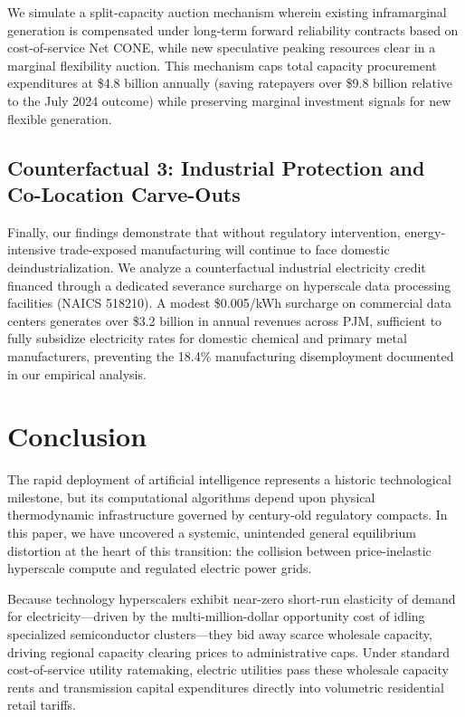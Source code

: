 \documentclass[11pt,a4paper]{article}
\begin{document}
We simulate a split-capacity auction mechanism wherein existing inframarginal generation is compensated under long-term forward reliability contracts based on cost-of-service Net CONE, while new speculative peaking resources clear in a marginal flexibility auction. This mechanism caps total capacity procurement expenditures at \$4.8 billion annually (saving ratepayers over \$9.8 billion relative to the July 2024 outcome) while preserving marginal investment signals for new flexible generation.

\subsection{Counterfactual 3: Industrial Protection and Co-Location Carve-Outs}

Finally, our findings demonstrate that without regulatory intervention, energy-intensive trade-exposed manufacturing will continue to face domestic deindustrialization. We analyze a counterfactual industrial electricity credit financed through a dedicated severance surcharge on hyperscale data processing facilities (NAICS 518210). A modest \$0.005/kWh surcharge on commercial data centers generates over \$3.2 billion in annual revenues across PJM, sufficient to fully subsidize electricity rates for domestic chemical and primary metal manufacturers, preventing the 18.4\% manufacturing disemployment documented in our empirical analysis.

\newpage

\section{Conclusion}\label{sec:conclusion}

The rapid deployment of artificial intelligence represents a historic technological milestone, but its computational algorithms depend upon physical thermodynamic infrastructure governed by century-old regulatory compacts. In this paper, we have uncovered a systemic, unintended general equilibrium distortion at the heart of this transition: the collision between price-inelastic hyperscale compute and regulated electric power grids.

Because technology hyperscalers exhibit near-zero short-run elasticity of demand for electricity---driven by the multi-million-dollar opportunity cost of idling specialized semiconductor clusters---they bid away scarce wholesale capacity, driving regional capacity clearing prices to administrative caps. Under standard cost-of-service utility ratemaking, electric utilities pass these wholesale capacity rents and transmission capital expenditures directly into volumetric residential retail tariffs.
\end{document}
